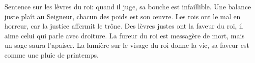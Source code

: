 Sentence sur les lèvres du roi:
	quand il juge, sa bouche est infaillible.
Une balance juste plaît au Seigneur,
	chacun des poids est son œuvre.
Les rois ont le mal en horreur,
	car la justice affermit le trône.
Des lèvres justes ont la faveur du roi,
	il aime celui qui parle avec droiture.
La fureur du roi est messagère de mort,
	mais un sage saura l’apaiser.
La lumière sur le visage du roi donne la vie,
	sa faveur est comme une pluie de printemps.
